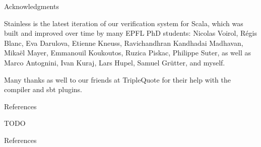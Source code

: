 \documentclass[
  ignorenonframetext,
]{beamer}
\newif\ifbibliography
\begin{document}
\begin{frame}{Acknowledgments}
\protect\hypertarget{acknowledgments}{}

Stainless is the latest iteration of our verification system for Scala,
which was built and improved over time by many EPFL PhD students:
Nicolas Voirol, Régis Blanc, Eva Darulova, Etienne Kneuss, Ravichandhran
Kandhadai Madhavan, Mikaël Mayer, Emmanouil Koukoutos, Ruzica Piskac,
Philippe Suter, as well as Marco Antognini, Ivan Kuraj, Lars Hupel,
Samuel Grütter, and myself.

Many thanks as well to our friends at TripleQuote for their help with
the compiler and sbt plugins.

\end{frame}

\begin{frame}[allowframebreaks]{References}
\protect\hypertarget{references}{}

TODO

\end{frame}

\begin{frame}[allowframebreaks]{References}
  \bibliographytrue
  \printbibliography[heading=none]
\end{frame}
\end{document}
